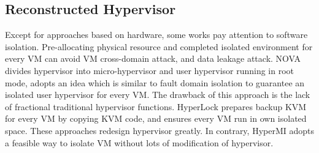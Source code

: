 \documentclass[conference]{IEEEtran}
\begin{document}
\subsection{Reconstructed Hypervisor }
Except for approaches based on hardware, some works\cite{nexen,Steinberg2010NOVA,hyperlock} pay attention to software isolation. Pre-allocating physical resource and completed isolated environment for every VM can avoid VM cross-domain attack, and data leakage attack. NOVA\cite{Steinberg2010NOVA} divides hypervisor into micro-hypervisor and user hypervisor running in root mode, adopts an idea which is similar to fault domain isolation to guarantee an isolated user hypervisor for every VM. The drawback of this approach is the lack of fractional traditional hypervisor functions. HyperLock \cite{hyperlock} prepares backup KVM for every VM by copying KVM code, and ensures every VM run in own isolated space. 
These approaches redesign hypervisor greatly. In contrary, HyperMI adopts a feasible way to isolate VM without lots of modification of hypervisor. 
\end{document}
